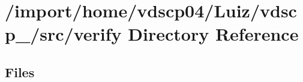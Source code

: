 \section{/import/home/vdscp04/\+Luiz/vdscp\+\_/src/verify Directory Reference}
\label{dir_9a07f45d8c1eb6e340733fb98565acbb}
\subsection*{Files}
\begin{DoxyCompactItemize}
\end{DoxyCompactItemize}
